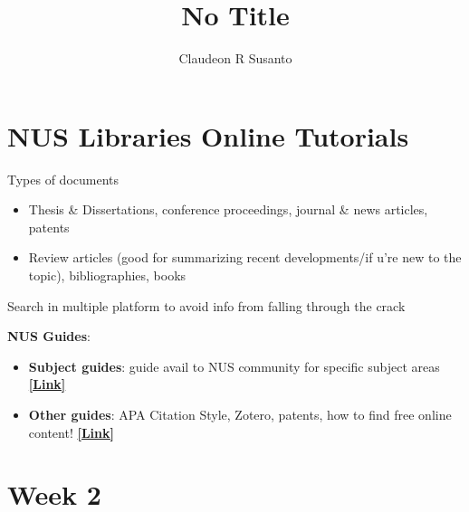 \documentclass{article}
\title{No Title}
\author{Claudeon R Susanto}
\date{}
\begin{document}
{}\selectfont
\begin{multicols}{2}
\section{NUS Libraries Online Tutorials}

Types of documents
\begin{itemize}
	\item Thesis \& Dissertations, conference proceedings, journal \& news articles, patents
	\item Review articles (good for summarizing recent developments/if u're new to the topic), bibliographies, books
\end{itemize}

Search in multiple platform to avoid info from falling through the crack

\textbf{NUS Guides}:
\begin{itemize}
	\item \textbf{Subject guides}: guide avail to NUS community for specific subject areas \href{https://libguides.nus.edu.sg/?sg=s}{\textbf{[Link]}}
	\item \textbf{Other guides}: APA Citation Style, Zotero, patents, how to find free online content! \href{https://libguides.nus.edu.sg/?b=t}{\textbf{[Link]}}
\end{itemize}


\section{Week 2}

\end{multicols}
\end{document}
